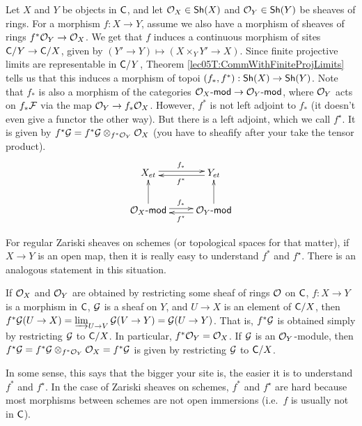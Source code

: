 

 Let $X$ and $Y$ be objects in $\text{\sf C}$, and let $\mathcal{O}_X\in \text{\sf Sh}(X)$ and $\mathcal{O}_Y\in \text{\sf Sh}(Y)$ be
 sheaves of rings. For a morphism $f:X\to Y$, assume we also have a morphism of sheaves
 of rings $f^*\mathcal{O}_Y\to \mathcal{O}_X$. We get that $f$ induces a continuous morphism of sites
 $\text{\sf C}/Y\to \text{\sf C}/X$, given by $(Y'\to Y)\mapsto (X\times_Y Y'\to X)$. Since finite projective
 limits are representable in $\text{\sf C}/Y$, Theorem \ref{lec05T:CommWithFiniteProjLimits} tells
 us that this induces a morphism of topoi $(f_*,f^*):\text{\sf Sh}(X)\to \text{\sf Sh}(Y)$. Note that $f_*$
 is also a morphism of the categories $\mathcal{O}_X\textrm{-\sf mod}\to \mathcal{O}_Y\textrm{-\sf mod}$, where $\mathcal{O}_Y$ acts on
 $f_*\mathcal{F}$ via the map $\mathcal{O}_Y\to f_*\mathcal{O}_X$. However, $f^*$ is not left adjoint to $f_*$ (it
 doesn't even give a functor the other way). But there is a left adjoint, which we call
 $f^\star$. It is given by $f^\star\mathcal{G} = f^*\mathcal{G}\otimes_{f^*\mathcal{O}_Y}\mathcal{O}_X$ (you have to sheafify
 after your take the tensor product). 
 \[\xymatrix{
    X_{et}\ar@<.5ex>[r]^{f_*} & Y_{et}\ar@<.5ex>[l]^{f^*}\\
    \O_X\mod \ar@<.5ex>[r]^{f_*} \ar[u] & \O_Y\mod\ar@<.5ex>[l]^{f^\star} \ar[u]
 }\]
 \begin{remark}\label{lec07R:easy_pullbacks}
   For regular Zariski sheaves on schemes (or topological spaces for that matter), if
   $X\to Y$ is an open map, then it is really easy to understand $f^*$ and $f^\star$.
   There is an analogous statement in this situation.

   If $\mathcal{O}_X$ and $\mathcal{O}_Y$ are obtained by restricting some sheaf of rings $\mathcal{O}$ on $\text{\sf C}$,
   $f:X\to Y$ is a morphism in $\text{\sf C}$, $\mathcal{G}$ is a sheaf on $Y$, and $U\to X$ is an element
   of $\text{\sf C}/X$, then $f^*\mathcal{G}(U\to X) = \varinjlim_{U\to V} \mathcal{G}(V\to Y) = \mathcal{G}(U\to Y)$. That
   is, $f^*\mathcal{G}$ is obtained simply by restricting $\mathcal{G}$ to $\text{\sf C}/X$. In particular,
   $f^*\mathcal{O}_Y=\mathcal{O}_X$. If $\mathcal{G}$ is an $\mathcal{O}_Y$-module, then $f^\star\mathcal{G} = f^*\mathcal{G}\otimes_{f^*\mathcal{O}_Y}
   \mathcal{O}_X = f^*\mathcal{G}$ is given by restricting $\mathcal{G}$ to $\text{\sf C}/X$.

   In some sense, this says that the bigger your site is, the easier it is to understand
   $f^*$ and $f^\star$. In the case of Zariski sheaves on schemes, $f^*$ and $f^\star$
   are hard because most morphisms between schemes are not open immersions (i.e.~$f$ is
   usually not in $\text{\sf C}$).
 \end{remark}
